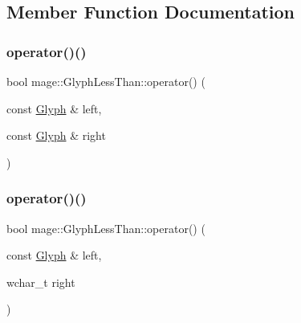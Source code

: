 \subsection{Member Function Documentation}
\hypertarget{structmage_1_1_glyph_less_than_a5ba9326b1293585e6257cf1d5697a1ba}{}\label{structmage_1_1_glyph_less_than_a5ba9326b1293585e6257cf1d5697a1ba} 
\subsubsection{\texorpdfstring{operator()()}{operator()()}\hspace{0.1cm}{\footnotesize\ttfamily [1/3]}}
{\footnotesize\ttfamily bool mage\+::\+Glyph\+Less\+Than\+::operator() (\begin{DoxyParamCaption}\item[{const \hyperlink{structmage_1_1_glyph}{Glyph} \&}]{left,  }\item[{const \hyperlink{structmage_1_1_glyph}{Glyph} \&}]{right }\end{DoxyParamCaption})}

\hypertarget{structmage_1_1_glyph_less_than_a263e9b07d9a3d84173739971abc5e217}{}\label{structmage_1_1_glyph_less_than_a263e9b07d9a3d84173739971abc5e217} 
\subsubsection{\texorpdfstring{operator()()}{operator()()}\hspace{0.1cm}{\footnotesize\ttfamily [2/3]}}
{\footnotesize\ttfamily bool mage\+::\+Glyph\+Less\+Than\+::operator() (\begin{DoxyParamCaption}\item[{const \hyperlink{structmage_1_1_glyph}{Glyph} \&}]{left,  }\item[{wchar\+\_\+t}]{right }\end{DoxyParamCaption})}

\hypertarget{structmage_1_1_glyph_less_than_a1ab127f38f1043b2361dcf73c3510dfd}{}\label{structmage_1_1_glyph_less_than_a1ab127f38f1043b2361dcf73c3510dfd} 
